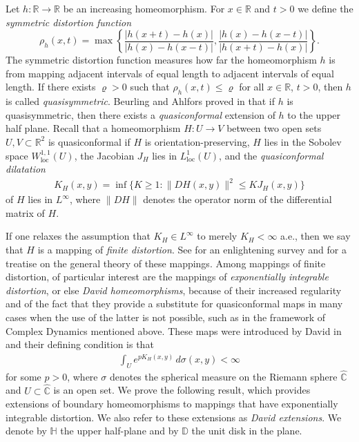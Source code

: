 \documentclass{amsart}
\theoremstyle{plain}
\theoremstyle{definition}
\theoremstyle{remark}
\numberwithin{equation}{section}
\numberwithin{theorem}{section}
\numberwithin{conjecture}{section}
\newcommand{\R}{\mathbb R}
\newcommand{\C}{\mathbb C}
\newcommand{\D}{\mathbb D}
\newcommand{\1}{\mathbf 1}
\newcommand{\UHP}{\mathbb H}
\DeclareMathOperator{\loc}{\mathrm{loc}}
\begin{document}
Let $h\colon \R \to \R$ be an increasing homeomorphism. For $x\in \R$ and $t>0$ we define the \textit{symmetric distortion function}
$$\rho_h(x,t)= \max \left\{ \frac{|h(x+t)-h(x)|}{|h(x)-h(x-t)|}, \frac{|h(x)-h(x-t)|}{|h(x+t)-h(x)|}\right\}.$$
The symmetric distortion function measures how far the homeomorphism $h$ is from mapping adjacent intervals of equal length to adjacent intervals of equal length. If there exists $\varrho>0$ such that $\rho_h(x,t)\leq \varrho$ for all $x\in \R$, $t>0$, then $h$ is called \textit{quasisymmetric}. Beurling and Ahlfors proved in \cite{BeurlingAhlfors:extension} that 
if $h$ is quasisymmetric, then there exists a \textit{quasiconformal} extension of $h$ to the upper half plane. Recall that a homeomorphism $H\colon U\to V$ between two open sets $U,V\subset \R^2$ is quasiconformal if $H$ is orientation-preserving, $H$ lies in the Sobolev space  $W^{1,1}_{\loc}(U)$, the Jacobian $J_H$ lies in $L^1_{\loc}(U)$, and the \textit{quasiconformal dilatation}
\begin{align*}
K_H(x,y)= \inf\{ K\geq 1 : \|DH(x,y)\|^2\leq K J_H(x,y)  \}
\end{align*}
of $H$ lies in $L^\infty$, where $\|DH\|$ denotes the operator norm of the differential matrix of $H$. 

If one relaxes the assumption that $K_H\in L^\infty$ to merely $K_H<\infty$ a.e., then we say that $H$ is a mapping of \textit{finite distortion}. See \cite{Koskela:survey} for an enlightening survey and \cite{HenclKoskela:finitedistortion} for a treatise on the general theory of these mappings. Among mappings of finite distortion, of particular interest are the mappings of \textit{exponentially integrable distortion}, or else \textit{David homeomorphisms}, because of their increased regularity and of the fact that they provide a substitute for quasiconformal maps in many cases when the use of the latter is not possible, such as in the framework of Complex Dynamics mentioned above. These maps were introduced by David in \cite{David:maps} and their defining condition is that 
\begin{align*}
\int_U e^{pK_H(x,y)} \, d\sigma(x,y) <\infty
\end{align*}
for some $p>0$, where $\sigma$ denotes the spherical measure on the Riemann sphere $\widehat{\C}$ and $U\subset \widehat{\C}$ is an open set. We prove the following result, which provides extensions of boundary homeomorphisms to mappings that have exponentially integrable distortion. We also refer to these extensions as \textit{David extensions}. We denote by $\UHP$ the upper half-plane and by $\D$ the unit disk in the plane.
\end{document}
